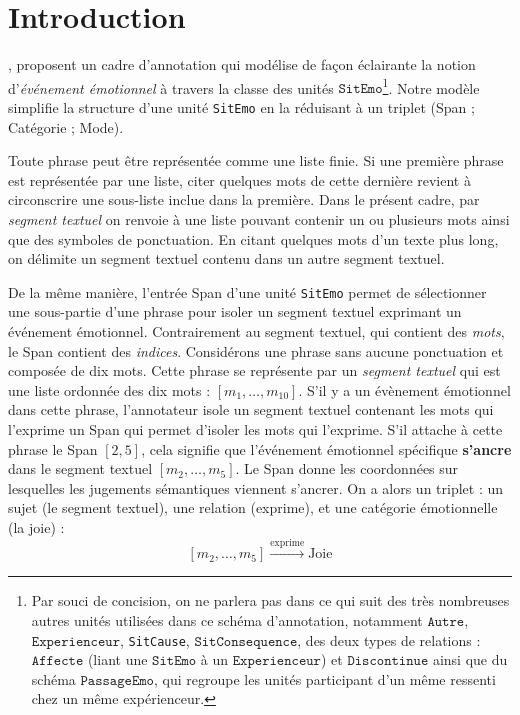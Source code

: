 \documentclass[french, 11pt]{article}
\begin{document}

\section*{Introduction}

\textcite{etienne2021}, \parencite*{etienne2023} proposent un cadre d'annotation qui modélise de façon éclairante la notion d'\emph{événement émotionnel} à travers la classe des unités $\texttt{SitEmo}$\footnote{Par souci de concision, on ne parlera pas dans ce qui suit des très nombreuses autres unités utilisées dans ce schéma d'annotation, notamment $\texttt{Autre}$,
$\texttt{Experienceur}$, \texttt{SitCause},
$\texttt{SitConsequence}$, des deux types de relations :
$\texttt{Affecte}$ (liant une $\texttt{SitEmo}$ à un
$\texttt{Experienceur}$) et $\texttt{Discontinue}$ ainsi que du schéma
$\texttt{PassageEmo}$, qui regroupe les unités participant d'un même
ressenti chez un même expérienceur.}. Notre modèle simplifie la structure d'une unité \texttt{SitEmo} en la réduisant à un triplet {\selectfont\small (Span ; Catégorie ; Mode)}. 

\vspace{1cm}

Toute phrase peut être représentée comme une liste finie. Si une première phrase est représentée par une liste, citer quelques mots de cette dernière revient à circonscrire une sous-liste inclue dans la première. Dans le présent cadre, par \textit{segment textuel} on renvoie à une liste pouvant contenir un ou plusieurs mots ainsi que des symboles de ponctuation. En citant quelques mots d'un texte plus long, on délimite un segment textuel contenu dans un autre segment textuel. 

De la même manière, l'entrée {\selectfont\small Span} d'une unité \texttt{SitEmo} permet de sélectionner une sous-partie d’une phrase pour isoler un segment textuel exprimant un événement émotionnel. Contrairement au segment textuel, qui contient des \textit{mots}, le {\selectfont\small Span} contient des \textit{indices}. Considérons une phrase sans aucune ponctuation et composée de dix mots. Cette phrase se représente par un \textit{segment textuel} qui est une liste ordonnée des dix mots : $[m_{1}, \ldots, m_{10}]$. S'il y a un évènement émotionnel dans cette phrase, l'annotateur isole un segment textuel contenant les mots qui l'exprime   un {\selectfont\small Span} qui permet d'isoler les mots qui l'exprime. S'il attache à cette phrase le {\selectfont\small Span} $[2,5]$, cela signifie que l'événement émotionnel spécifique \textbf{s’ancre} dans le segment textuel $[m_{2}, \ldots, m_{5}]$. Le {\selectfont\small Span} donne les coordonnées sur lesquelles les jugements sémantiques viennent s’ancrer. On a alors un triplet : un sujet (le segment textuel), une relation (exprime), et une catégorie émotionnelle (la joie) :
\[
[m_{2}, \ldots, m_{5}] \xrightarrow{\text{exprime}} \text{Joie}
\]
\end{document}
